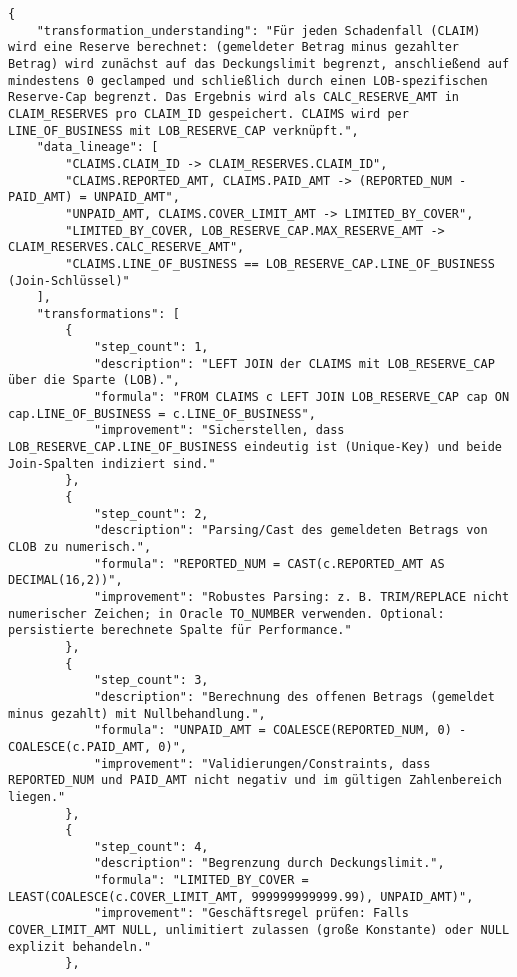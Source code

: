 \begin{lstlisting}[caption={Ausgabe: GPT-5 Anwendungsfall 10 Robustheitsdurchlauf},label={gpt_case10_prompt3}]
{
    "transformation_understanding": "Für jeden Schadenfall (CLAIM) wird eine Reserve berechnet: (gemeldeter Betrag minus gezahlter Betrag) wird zunächst auf das Deckungslimit begrenzt, anschließend auf mindestens 0 geclamped und schließlich durch einen LOB-spezifischen Reserve-Cap begrenzt. Das Ergebnis wird als CALC_RESERVE_AMT in CLAIM_RESERVES pro CLAIM_ID gespeichert. CLAIMS wird per LINE_OF_BUSINESS mit LOB_RESERVE_CAP verknüpft.",
    "data_lineage": [
        "CLAIMS.CLAIM_ID -> CLAIM_RESERVES.CLAIM_ID",
        "CLAIMS.REPORTED_AMT, CLAIMS.PAID_AMT -> (REPORTED_NUM - PAID_AMT) = UNPAID_AMT",
        "UNPAID_AMT, CLAIMS.COVER_LIMIT_AMT -> LIMITED_BY_COVER",
        "LIMITED_BY_COVER, LOB_RESERVE_CAP.MAX_RESERVE_AMT -> CLAIM_RESERVES.CALC_RESERVE_AMT",
        "CLAIMS.LINE_OF_BUSINESS == LOB_RESERVE_CAP.LINE_OF_BUSINESS (Join-Schlüssel)"
    ],
    "transformations": [
        {
            "step_count": 1,
            "description": "LEFT JOIN der CLAIMS mit LOB_RESERVE_CAP über die Sparte (LOB).",
            "formula": "FROM CLAIMS c LEFT JOIN LOB_RESERVE_CAP cap ON cap.LINE_OF_BUSINESS = c.LINE_OF_BUSINESS",
            "improvement": "Sicherstellen, dass LOB_RESERVE_CAP.LINE_OF_BUSINESS eindeutig ist (Unique-Key) und beide Join-Spalten indiziert sind."
        },
        {
            "step_count": 2,
            "description": "Parsing/Cast des gemeldeten Betrags von CLOB zu numerisch.",
            "formula": "REPORTED_NUM = CAST(c.REPORTED_AMT AS DECIMAL(16,2))",
            "improvement": "Robustes Parsing: z. B. TRIM/REPLACE nicht numerischer Zeichen; in Oracle TO_NUMBER verwenden. Optional: persistierte berechnete Spalte für Performance."
        },
        {
            "step_count": 3,
            "description": "Berechnung des offenen Betrags (gemeldet minus gezahlt) mit Nullbehandlung.",
            "formula": "UNPAID_AMT = COALESCE(REPORTED_NUM, 0) - COALESCE(c.PAID_AMT, 0)",
            "improvement": "Validierungen/Constraints, dass REPORTED_NUM und PAID_AMT nicht negativ und im gültigen Zahlenbereich liegen."
        },
        {
            "step_count": 4,
            "description": "Begrenzung durch Deckungslimit.",
            "formula": "LIMITED_BY_COVER = LEAST(COALESCE(c.COVER_LIMIT_AMT, 999999999999.99), UNPAID_AMT)",
            "improvement": "Geschäftsregel prüfen: Falls COVER_LIMIT_AMT NULL, unlimitiert zulassen (große Konstante) oder NULL explizit behandeln."
        },

\end{lstlisting}
